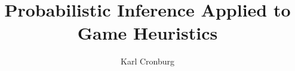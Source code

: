\documentclass[color = usenames]{beamer}
\title{Probabilistic Inference Applied to Game Heuristics}
\author{Karl Cronburg}
\institute{Tufts University}
\date{}
\begin{document}
\frame{\titlepage}


\end{document}
